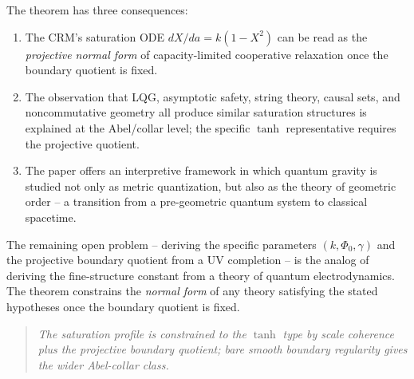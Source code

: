 \documentclass[aps,prd,twocolumn,superscriptaddress,nofootinbib]{revtex4-2}
\begin{document}
The theorem has three consequences:

\begin{enumerate}
\item The CRM's saturation ODE $dX/da = k(1-X^2)$ can be read as the \textit{projective normal form} of capacity-limited cooperative relaxation once the boundary quotient is fixed.

\item The observation that LQG, asymptotic safety, string theory, causal sets, and noncommutative geometry all produce similar saturation structures is explained at the Abel/collar level; the specific $\tanh$ representative requires the projective quotient.

\item The paper offers an interpretive framework in which quantum gravity is studied not only as metric quantization, but also as the theory of geometric order -- a transition from a pre-geometric quantum system to classical spacetime.
\end{enumerate}

The remaining open problem -- deriving the specific parameters $(k, \Phi_0, \gamma)$ and the projective boundary quotient from a UV completion -- is the analog of deriving the fine-structure constant from a theory of quantum electrodynamics. The theorem constrains the \textit{normal form} of any theory satisfying the stated hypotheses once the boundary quotient is fixed.

\begin{quote}
\textit{The saturation profile is constrained to the $\tanh$ type by scale coherence plus the projective boundary quotient; bare smooth boundary regularity gives the wider Abel-collar class.}
\end{quote}
\end{document}
